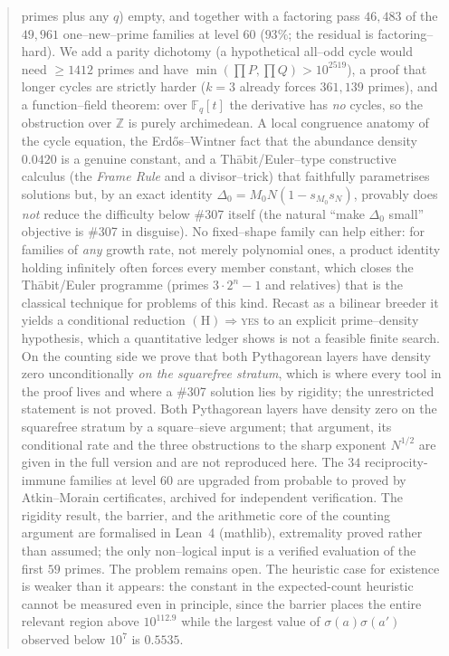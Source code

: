 \documentclass[11pt]{article}
\theoremstyle{definition}
\begin{document}
\begin{abstract}
primes plus any $q$) empty, and together with a factoring pass $46{,}483$ of the $49{,}961$
one--new--prime families at level $60$ ($93\%$; the residual is factoring--hard). We add a parity dichotomy (a hypothetical all--odd
cycle would need $\ge 1412$ primes and have $\min(\prod P,\prod Q)>10^{2519}$), a proof that longer
cycles are strictly harder ($k=3$ already forces $361{,}139$ primes), and a function--field theorem:
over $\mathbb{F}_q[t]$ the derivative has \emph{no} cycles, so the obstruction over $\mathbb{Z}$ is
purely archimedean. A local congruence anatomy of the cycle equation, the Erd\H{o}s--Wintner fact
that the abundance density $0.0420$ is a genuine constant, and a Th\=abit/Euler--type constructive
calculus (the \emph{Frame
Rule} and a divisor--trick) that faithfully parametrises solutions but, by an exact identity
$\Delta_0=M_0N(1-s_{M_0}s_N)$, provably does \emph{not} reduce the difficulty below \#307 itself
(the natural ``make $\Delta_0$ small'' objective is \#307 in disguise). No fixed--shape family can
help either: for families of \emph{any} growth rate, not merely polynomial ones, a product identity
holding infinitely often forces every member constant, which closes the Th\=abit/Euler programme
(primes $3\cdot2^{n}-1$ and relatives) that is the classical technique for problems of this kind. Recast as a bilinear breeder it yields a conditional reduction
$(\mathrm{H})\Rightarrow$\textsc{yes} to an explicit prime--density hypothesis, which a quantitative
ledger shows is not a feasible finite search. On the counting side we prove that both Pythagorean layers have density zero
unconditionally \emph{on the squarefree stratum}, which is where every tool in the proof lives and
where a \#307 solution lies by rigidity; the unrestricted statement is not proved. Both Pythagorean layers have density zero on the squarefree stratum by a square--sieve argument; that argument, its conditional rate and the three obstructions to the sharp exponent $N^{1/2}$ are given in the full version and are not reproduced here. The $34$ reciprocity-immune families at
level $60$ are upgraded from probable to proved by Atkin--Morain certificates, archived for
independent verification. The rigidity result, the barrier, and the arithmetic core of the counting
argument are formalised in Lean~4 (mathlib), extremality proved rather than assumed; the only
non--logical input is a verified evaluation of the first $59$ primes. The problem remains open. The heuristic case for existence is weaker than it appears: the constant in
the expected-count heuristic cannot be measured even in principle, since the barrier places the
entire relevant region above $10^{112.9}$ while the largest value of $\sigma(a)\sigma(a')$ observed
below $10^{7}$ is $0.5535$.
\end{abstract}
\end{document}
